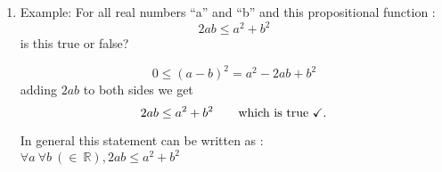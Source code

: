 \documentclass[10pt,letterpaper]{article}
\begin{document}
{\begin{enumerate}
    ``There is a positive integer `n' such that ''
    $$ 3n^{2} -5n +2 \text{ yields an odd \#.}$$
    
    In this case: $S = \mathbb{N}^{+} = \{1, 2,3,\ldots n\}$ $P(n) \qquad 3n^{2} -5n2 +2$ where $n$ is an odd number.
    
    Does there exist $n$ in $S$ such that $P(n)$ is true?
    
    -Try an odd and even number...
    
    \textit{even number :}

    \begin{equation}
    \boxed  {
            \begin{array}{rcl}
                     3n^{2}
                     & = \ 3 \ (4k^{2})\\
                     & = \ 2 \ (6k^{2})\\
                     \hline
                     5n
                     & = \ 5 \ (2k) \\
                     & = \ 2 \ (5k) \\
                     \hline
                    + 2 \\
            \end{array}
            }
    \end{equation}
     is even.

    \textit{odd number :}

    \begin{equation}
    \boxed  {
            \begin{array}{rcl}
                     3n^{2}\\
                     &= \ 3(2k-1)^{2}\\
                     &= \ 3(4k^{2}-4k+1)\\
                     &= \ 3(4k^{2}-4k)+3\\
                     &= \ 3(4k^{2}-4k)+4-1\\
                     &= \ 2(6k^{2} -6k +2) -1\\
            \end{array}
            }
    \end{equation}
     is odd.
     
     Thus
     this statement is false because p(n) yields an even number when given a number ($x$) that is a variation of $2k$.

\item[] Example: For all real numbers ``a'' and ``b'' and this propositional function : 
$$2ab \leq a^{2} + b^{2}$$ 
is this true or false?

$$ 0 \leq (a-b)^{2} = a^{2} - 2ab + b^{2} $$
adding $2ab$ to both sides we get 
$$2ab \leq a^{2} + b^{2} \qquad \text{which is true \checkmark.}$$

\begin{center}
In general this statement can be written as : \\
$ \forall a \ \forall b \ ( \in  \ \mathbb{R} ),  2ab \leq a^{2} + b^{2}$ \checkmark
\end{center}

\end{enumerate}
}
\end{document}
